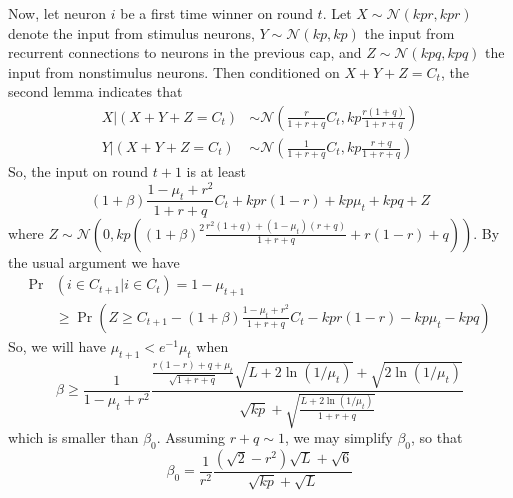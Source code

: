 \documentclass[final,12pt]{colt2022} %
\begin{document}
Now, let neuron $i$ be a first time winner on round $t$. Let $X \sim \mathcal N(kpr, kpr)$ denote the input from stimulus neurons, $Y \sim \mathcal N(kp, kp)$ the input from recurrent connections to neurons in the previous cap, and $Z \sim \mathcal N(kpq, kpq)$ the input from nonstimulus neurons. Then conditioned on $X + Y + Z = C_t$, the second lemma indicates that \begin{align*}
    X | (X + Y + Z = C_t) &\sim \mathcal N\left(\frac{r}{1 + r + q}C_t, kp\frac{r(1+q)}{1 + r + q}\right)\\
    Y | (X + Y + Z = C_t) &\sim \mathcal N\left(\frac{1}{1 + r + q}C_t, kp\frac{r+q}{1 + r+q}\right)
\end{align*} So, the input on round $t+1$ is at least 
\[(1+\beta)\frac{1 - \mu_t + r^2}{1 + r + q}C_t + kpr(1-r) + kp\mu_t + kpq + Z\] where $Z \sim \mathcal N\left(0, kp\left((1+\beta)^2\frac{r^2(1+q) + (1-\mu_t)(r+q)}{1 + r + q} + r(1-r) + q\right)\right)$. By the usual argument we have \begin{align*}
    \Pr &(i \in C_{t+1} | i \in C_t) = 1 - \mu_{t+1}\\
    &\geq \Pr \left(Z \geq C_{t+1} - (1+\beta)\frac{1 - \mu_t + r^2}{1 + r + q}C_t - kpr(1-r) - kp\mu_t - kpq\right)
\end{align*} 
So, we will have $\mu_{t+1} < e^{-1}\mu_t $ when \[\beta \geq \frac{1}{1 - \mu_t + r^2}\frac{\frac{r(1-r) + q + \mu_t}{\sqrt{1 + r + q}}\sqrt{L + 2\ln(1/\mu_t)} + \sqrt{2\ln(1/\mu_t)}}{\sqrt{kp} + \sqrt{\frac{L + 2\ln(1 / \mu_t)}{1 + r + q}}}\] which is smaller than $\beta_0$. 
Assuming $r+q \sim 1$, we may simplify $\beta_0$, so that \[\beta_0 = \frac{1}{r^2}\frac{\left(\sqrt{2} - r^2\right)\sqrt{L} + \sqrt{6}}{\sqrt{kp} + \sqrt{L}}\]
\end{document}

